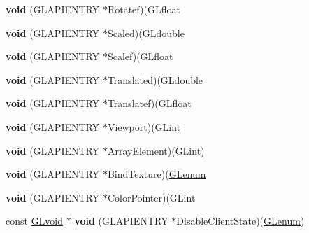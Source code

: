 \begin{DoxyCompactItemize}
{\bfseries void} (G\+L\+A\+P\+I\+E\+N\+T\+RY $\ast$Rotatef)(G\+Lfloat
\item 
\mbox{\label{struct_____g_ldispatch_table_rec_ad77c30b2b7c9e0988adfbd2839914367}} 
{\bfseries void} (G\+L\+A\+P\+I\+E\+N\+T\+RY $\ast$Scaled)(G\+Ldouble
\item 
\mbox{\label{struct_____g_ldispatch_table_rec_a8fba1608b897556fa4aefe4bdbaf4c3e}} 
{\bfseries void} (G\+L\+A\+P\+I\+E\+N\+T\+RY $\ast$Scalef)(G\+Lfloat
\item 
\mbox{\label{struct_____g_ldispatch_table_rec_a1e8690142504dc01cb8be42baf569354}} 
{\bfseries void} (G\+L\+A\+P\+I\+E\+N\+T\+RY $\ast$Translated)(G\+Ldouble
\item 
\mbox{\label{struct_____g_ldispatch_table_rec_a1c0ca468e594db13155ed8d5c62aa81c}} 
{\bfseries void} (G\+L\+A\+P\+I\+E\+N\+T\+RY $\ast$Translatef)(G\+Lfloat
\item 
\mbox{\label{struct_____g_ldispatch_table_rec_a6c3c6af8be0d3f63d76ac721bb39b558}} 
{\bfseries void} (G\+L\+A\+P\+I\+E\+N\+T\+RY $\ast$Viewport)(G\+Lint
\item 
\mbox{\label{struct_____g_ldispatch_table_rec_a46163ab7a0d371d826ca30d8f8c4c5cf}} 
{\bfseries void} (G\+L\+A\+P\+I\+E\+N\+T\+RY $\ast$Array\+Element)(G\+Lint)
\item 
\mbox{\label{struct_____g_ldispatch_table_rec_ae3a424d7034d728cbd4fb90d47c1bb2b}} 
{\bfseries void} (G\+L\+A\+P\+I\+E\+N\+T\+RY $\ast$Bind\+Texture)(\hyperlink{interfacevoid}{G\+Lenum}
\item 
\mbox{\label{struct_____g_ldispatch_table_rec_a35b45e0c028d7423aea0f8f679fe75ad}} 
{\bfseries void} (G\+L\+A\+P\+I\+E\+N\+T\+RY $\ast$Color\+Pointer)(G\+Lint
\item 
\mbox{\label{struct_____g_ldispatch_table_rec_afa84d9608353872b140f198a914c9738}} 
const \hyperlink{interfacevoid}{G\+Lvoid} $\ast$ {\bfseries void} (G\+L\+A\+P\+I\+E\+N\+T\+RY $\ast$Disable\+Client\+State)(\hyperlink{interfacevoid}{G\+Lenum})

\end{DoxyCompactItemize}
